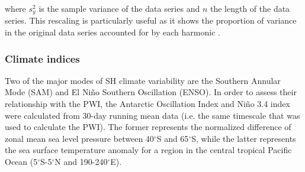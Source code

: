 \noindent where $s_y^2$ is the sample variance of the data series and $n$ the length of the data series. This rescaling is particularly useful as it shows the proportion of variance in the original data series accounted for by each harmonic \citep{Wilks2011}.

\subsubsection{Climate indices}
Two of the major modes of SH climate variability are the Southern Annular Mode (SAM) and El Ni\~{n}o Southern Oscillation (ENSO). In order to assess their relationship with the PWI, the Antarctic Oscillation Index \citep[AOI;][]{Gong1999} and Ni\~{n}o 3.4 index \citep{Trenberth2001} were calculated from 30-day running mean data (i.e. the same timescale that was used to calculate the PWI). The former represents the normalized difference of zonal mean sea level pressure between 40$^{\circ}$S and 65$^{\circ}$S, while the latter represents the sea surface temperature anomaly for a region in the central tropical Pacific Ocean (5$^{\circ}$S-5$^{\circ}$N and 190-240$^{\circ}$E). 


    